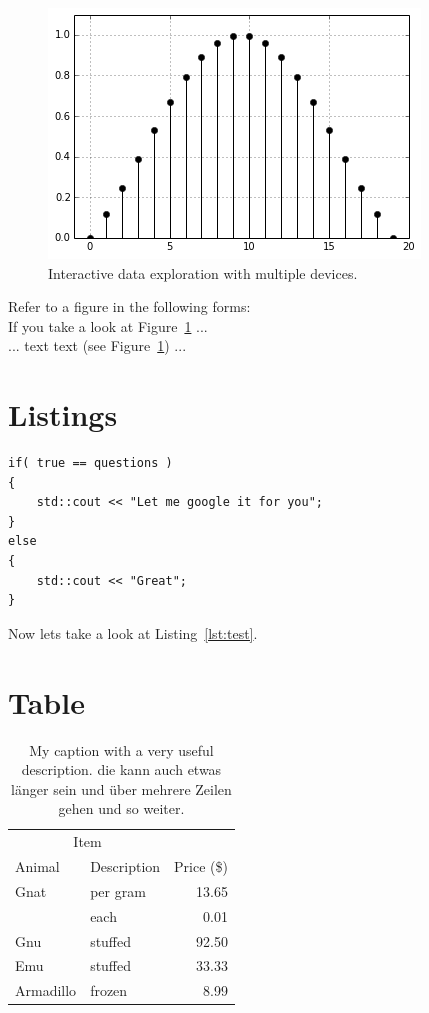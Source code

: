 \begin{figure}[ht!]
  \centering
  \includegraphics[width=1\columnwidth]{Figures/Example}
  \caption{Interactive data exploration with multiple devices.}
  \label{fig:example}
\end{figure}

Refer to a figure in the following forms:\\
If you take a look at Figure~\ref{fig:example} ...\\
... text text (see Figure~\ref{fig:example}) ...

\section{Listings}
\begin{lstlisting}[caption=A bit of source code., label=lst:test]
if( true == questions )
{
    std::cout << "Let me google it for you";
}
else
{
    std::cout << "Great";
}
\end{lstlisting}

Now lets take a look at Listing~\ref{lst:test}.

\newpage
\section{Table}

\begin{table}[ht!]
  \caption{My caption with a very useful description. die kann auch etwas länger sein und über mehrere Zeilen gehen und so weiter.}
  \label{my-label}
  \begin{tabular}{llr}
    \hline
    \multicolumn{2}{c}{Item} &            \\ \cline{1-2}
    Animal     & Description & Price (\$) \\ \hline
    Gnat       & per gram    & 13.65      \\
               & each        & 0.01       \\
    Gnu        & stuffed     & 92.50      \\
    Emu        & stuffed     & 33.33      \\
    Armadillo  & frozen      & 8.99       \\ \hline
  \end{tabular}
\end{table}

